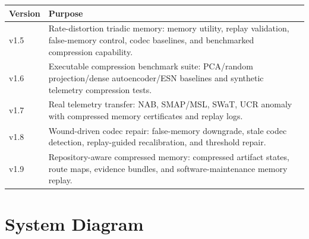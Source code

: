 \documentclass[12pt]{article}
\begin{document}
\begin{longtable}{p{}p{}}
\toprule
\textbf{Version} & \textbf{Purpose} \\
\midrule
v1.5 & Rate-distortion triadic memory: memory utility, replay validation,
false-memory control, codec baselines, and benchmarked compression capability. \\
v1.6 & Executable compression benchmark suite: PCA/random projection/dense
autoencoder/ESN baselines and synthetic telemetry compression tests. \\
v1.7 & Real telemetry transfer: NAB, SMAP/MSL, SWaT, UCR anomaly with compressed
memory certificates and replay logs. \\
v1.8 & Wound-driven codec repair: false-memory downgrade, stale codec detection,
replay-guided recalibration, and threshold repair. \\
v1.9 & Repository-aware compressed memory: compressed artifact states, route maps,
evidence bundles, and software-maintenance memory replay. \\
\bottomrule
\end{longtable}

\section{System Diagram}
\end{document}
